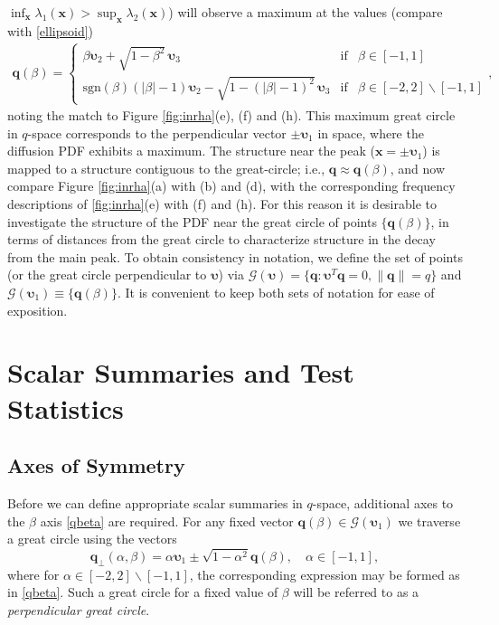 \documentclass[dvips,aoas,preprint]{imsart}
\numberwithin{equation}{section}
\theoremstyle{plain}
\newcommand{\q}{\mathbf{q}}
\newcommand{\bu}{\bs{\upsilon}}
\newcommand{\x}{\mathbf{x}}
\newcommand{\cG}{\mathcal{G}}
\newcommand{\bs}[1]{\boldsymbol{#1}}
\begin{document}
$\inf_{\x}\lambda_1(\x)>\sup_{\x}\lambda_2(\x)$) will observe a
maximum at the values (compare with \eqref{ellipsoid})
{\tiny\begin{eqnarray}\label{qbeta}
  \q(\beta) = \left\{
  \begin{array}{lcr}
    \beta \bu_2+\sqrt{1-\beta^2}\,\bu_3 & \text{if} & \beta\in[-1,1]\\
    \text{sgn} \left(\beta\right) (|\beta|-1)\bu_2 -
    \sqrt{1-(|\beta|-1)^2}\,  \bu_3 & \text{if} &
    \beta\in[-2,2]\backslash[-1,1]
  \end{array} \right. ,
\end{eqnarray}}
noting the match to Figure \ref{fig:inrha}(e), (f) and (h).  This
maximum great circle in $q$-space corresponds to the perpendicular
vector $\pm\bu_1$ in space, where the diffusion PDF exhibits a
maximum.  The structure near the peak ($\x=\pm\bu_1$) is mapped to a
structure contiguous to the great-circle; i.e., $\q\approx\q(\beta)$,
and now compare Figure \ref{fig:inrha}(a) with (b) and (d), with the
corresponding frequency descriptions of \ref{fig:inrha}(e) with (f)
and (h).  For this reason it is desirable to investigate the structure
of the PDF near the great circle of points $\{\q(\beta)\}$, in terms
of distances from the great circle to characterize structure in the decay from the main peak.  To obtain consistency in
notation, we define the set of points (or the great circle
perpendicular to $\bu$) via $\cG(\bu)=\{\q:\bu^T\q=0,\|\q\|=q\}$ and
$\cG(\bu_1)\equiv\{\q(\beta)\}$.  It is convenient to keep both sets
of notation for ease of exposition.

\section{Scalar Summaries and Test Statistics}

\subsection{Axes of Symmetry}

Before we can define appropriate scalar summaries in $q$-space,
additional axes to the $\beta$ axis \eqref{qbeta} are required.  For
any fixed vector $\q(\beta)\in\cG(\bu_1)$ we traverse a great circle
using the vectors
\begin{equation}\label{alphabetaplane}
  \q_\perp(\alpha,\beta) = \alpha\bu_1\pm\sqrt{1-\alpha^2}\q(\beta),
  \quad \alpha \in [-1,1],
\end{equation}
where for $\alpha\in\left[-2,2\right]\backslash[-1,1]$, the
corresponding expression may be formed as in \eqref{qbeta}.  Such a
great circle for a fixed value of $\beta$ will be referred to as a
{\em perpendicular great circle}.
\end{document}
